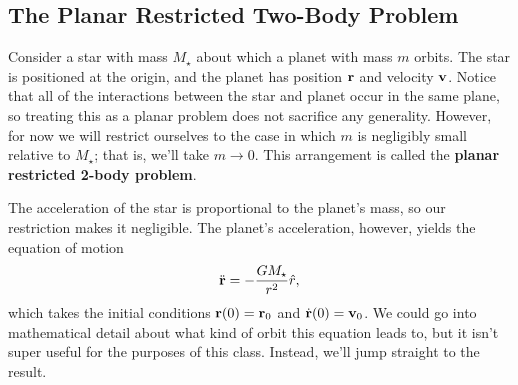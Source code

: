 \documentclass[../a062main.tex]{subfiles}
\begin{document}
\subsection*{The Planar Restricted Two-Body Problem}
Consider a star with mass $M_\star$ about which a planet with mass $m$ orbits.
The star is positioned at the origin, and the planet has position $\mathbf{r}$ and velocity $\mathbf{v}$.
Notice that all of the interactions between the star and planet occur in the same plane, so treating this as a planar problem does not sacrifice any generality.
However, for now we will restrict ourselves to the case in which $m$ is negligibly small relative to $M_\star$; that is, we'll take $m \to 0$.
This arrangement is called the \textbf{planar restricted 2-body problem}.

The acceleration of the star is proportional to the planet's mass, so our restriction makes it negligible.
The planet's acceleration, however, yields the equation of motion
\[ \ddot{\mathbf{r}} = -\frac{GM_\star}{r^2} \hat{r}, \]
which takes the initial conditions $\mathbf{r}(0) = \mathbf{r}_0$ and $\dot{\mathbf{r}}(0) = \mathbf{v}_0$.
We could go into mathematical detail about what kind of orbit this equation leads to, but it isn't super useful for the purposes of this class.
Instead, we'll jump straight to the result.
\end{document}
